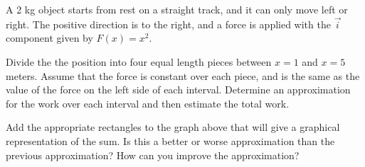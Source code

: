 \begin{problem}
\item A 2 kg object starts from rest on a straight track, and it can
  only move left or right. The positive direction is to the right, and
  a force is applied with the $\vec{i}$ component given by $F(x)=x^2$.




  \begin{subproblem}
  \item Divide the the position into four equal length pieces between
    $x=1$ and $x=5$ meters.  Assume that the force is constant over
    each piece, and is the same as the value of the force on the left
    side of each interval.  Determine an approximation for the work
    over each interval and then estimate the total work.
    \vfill
  \item Add the appropriate rectangles to the graph above that will
    give a graphical representation of the sum.  Is this a better or
    worse approximation than the previous approximation? How can you
    improve the approximation?
  \end{subproblem}
  \clearpage


\end{problem}
